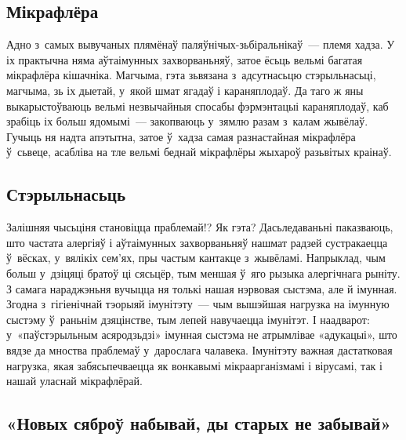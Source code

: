 \subsection*{Мікрафлёра}

Адно з~самых вывучаных плямёнаў паляўнічых-зьбі\-раль\-ні\-каў~--- племя хадза. У іх практычна няма аўтаімунных захворваньняў, затое ёсьць вельмі багатая мікрафлёра кішачніка. Магчыма, гэта зьвязана з~адсутнасьцю стэрыльнасьці, магчыма, зь іх дыетай, у~якой шмат ягадаў і караняплодаў. Да таго ж яны выкарыстоўваюць вельмі незвычайныя спосабы фэрмэнтацыі караняплодаў, каб зрабіць іх больш ядомымі~--- закопваюць у~зямлю разам з~калам жывёлаў. Гучыць ня надта апэтытна, затое ў~хадза самая разнастайная мікрафлёра ў~сьвеце, асабліва на тле вельмі беднай мікрафлёры жыхароў разьвітых краінаў.

\subsection*{Стэрыльнасьць}

Залішняя чысьціня становіцца праблемай!? Як гэта? Дасьледаваньні паказваюць, што частата алергіяў і аўтаімунных захворваньняў нашмат радзей сустракаецца ў~вёсках, у~вялікіх сем'ях, пры частым кантакце з~жывёламі. Напрыклад, чым больш у~дзіцяці братоў ці сясьцёр, тым меншая ў~яго рызыка алергічнага рыніту. З самага нараджэньня вучыцца ня толькі нашая нэрвовая сыстэма, але й імунная. Згодна з~гігіенічнай тэорыяй імунітэту~--- чым вышэйшая нагрузка на імунную сыстэму ў~раньнім дзяцінстве, тым лепей навучаецца імунітэт. І наадварот: у~«паўстэрыльным асяродзьдзі» імунная сыстэма не атрымлівае «адукацыі», што вядзе да мноства праблемаў у~дарослага чалавека. Імунітэту важная дастатковая нагрузка, якая забясьпечваецца як вонкавымі мікраарганізмамі і вірусамі, так і нашай уласнай мікрафлёрай. 



\subsection*{«Новых сяброў набывай, ды старых не забывай»}

